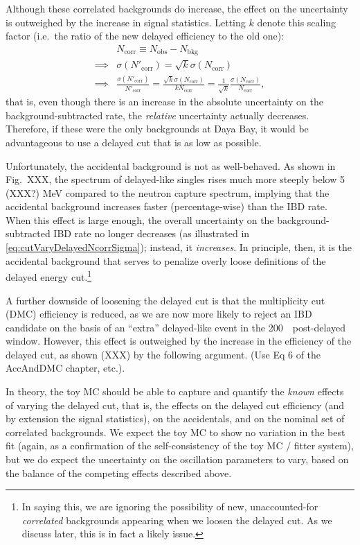 \documentclass[../thesis.tex]{subfiles}
\begin{document}
Although these correlated backgrounds do increase, the effect on the uncertainty is outweighed by the increase in signal statistics. Letting $k$ denote this scaling factor (i.e.\ the ratio of the new delayed efficiency to the old one):
\begin{align}
  \label{eq:cutVaryDelayedNcorrSigma}
  & N_{\mathrm{corr}} \equiv N_{\mathrm{obs}} - N_{\mathrm{bkg}} \\
  \implies & \sigma(N'_{\mathrm{corr}}) = \sqrt{k} \sigma(N_{\mathrm{corr}}) \\
  \implies & \frac{\sigma(N'_{\mathrm{corr}})}{N'_{\mathrm{corr}}} = \frac{\sqrt{k} \sigma(N_{\mathrm{corr}})}{k N_{\mathrm{corr}}} = \frac{1}{\sqrt{k}} \frac{\sigma(N_{\mathrm{corr}})}{N_{\mathrm{corr}}},
\end{align}
that is, even though there is an increase in the absolute uncertainty on the background-subtracted rate, the \emph{relative} uncertainty actually decreases. Therefore, if these were the only backgrounds at Daya Bay, it would be advantageous to use a delayed cut that is as low as possible.

Unfortunately, the accidental background is not as well-behaved. As shown in Fig.~XXX, the spectrum of delayed-like singles rises much more steeply below 5 (XXX?) MeV compared to the neutron capture spectrum, implying that the accidental background increases faster (percentage-wise) than the IBD rate. When this effect is large enough, the overall uncertainty on the background-subtracted IBD rate no longer decreases (as illustrated in \autoref{eq:cutVaryDelayedNcorrSigma}); instead, it \emph{increases}. In principle, then, it is the accidental background that serves to penalize overly loose definitions of the delayed energy cut.\footnote{In saying this, we are ignoring the possibility of new, unaccounted-for \emph{correlated} backgrounds appearing when we loosen the delayed cut. As we discuss later, this is in fact a likely issue.}

A further downside of loosening the delayed cut is that the multiplicity cut (DMC) efficiency is reduced, as we are now more likely to reject an IBD candidate on the basis of an ``extra'' delayed-like event in the 200~\us\ post-delayed window. However, this effect is outweighed by the increase in the efficiency of the delayed cut, as shown (XXX) by the following argument. (Use Eq 6 of the AccAndDMC chapter, etc.).

In theory, the toy MC should be able to capture and quantify the \emph{known} effects of varying the delayed cut, that is, the effects on the delayed cut efficiency (and by extension the signal statistics), on the accidentals, and on the nominal set of correlated backgrounds. We expect the toy MC to show no variation in the best fit (again, as a confirmation of the self-consistency of the toy MC / fitter system), but we do expect the uncertainty on the oscillation parameters to vary, based on the balance of the competing effects described above.
\end{document}
